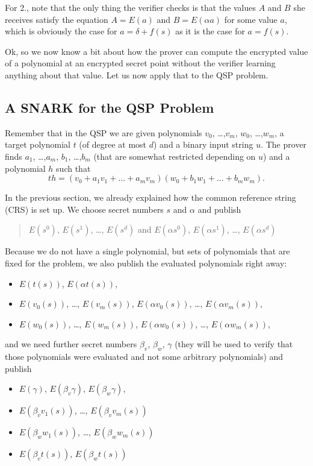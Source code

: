 \documentclass[11pt,letterpaper]{article}
\begin{document}
For 2., note that the only thing the verifier checks is that the values $A$ and $B$ she receives satisfy the equation $A = E(a)$ and $B = E(\alpha  a)$ for some value $a$, which is obviously the case for $a = \delta  + f(s)$ as it is the case for $a = f(s)$.


Ok, so we now know a bit about how the prover can compute the encrypted value of a polynomial at an encrypted secret point without the verifier learning anything about that value. Let us now apply that to the QSP problem.

\subsection{A SNARK for the QSP Problem}


Remember that in the QSP we are given polynomials $v_{0}$, \dots,$v_{m}$, $w_{0}$, \dots,$w_{m}$, a target polynomial $t$ (of degree at most $d$) and a binary input string $u$. The prover finds $a_{1}$, \dots,$a_{m}$, $b_{1}$, \dots,$b_{m}$ (that are somewhat restricted depending on $u$) and a polynomial $h$ such that
\[
t h = (v_{0} + a_{1}v_{1} +  \dots  + a_{m}v_{m}) (w_{0} + b_{1}w_{1} +  \dots  + b_{m}w_{m}).
\]


In the previous section, we already explained how the common reference string (CRS) is set up. We choose secret numbers $s$ and $\alpha$  and publish
\begin{quote}
$E(s^{0})$, $E(s^{1})$,  \dots, $E(s^{d})$ \quad and \quad $E(\alpha s^{0})$, $E(\alpha s^{1})$,  \dots, $E(\alpha s^{d})$
\end{quote}

Because we do not have a single polynomial, but sets of polynomials that are fixed for the problem, we also publish the evaluated polynomials right away:
\begin{itemize}
\item $E(t(s))$, $E(\alpha  t(s))$,
\item $E(v_{0}(s))$,  \dots, $E(v_{m}(s))$, $E(\alpha  v_{0}(s))$,  \dots, $E(\alpha  v_{m}(s))$,
\item $E(w_{0}(s))$,  \dots, $E(w_{m}(s))$, $E(\alpha  w_{0}(s))$,  \dots, $E(\alpha  w_{m}(s))$,
\end{itemize}


and we need further secret numbers $\beta _{v}$, $\beta _{w}$, $\gamma$  (they will be used to verify that those polynomials were evaluated and not some arbitrary polynomials) and publish
\begin{itemize}
\item $E(\gamma )$, $E(\beta _{v} \gamma )$, $E(\beta _{w} \gamma )$,
\item $E(\beta _{v} v_{1}(s))$,  \dots, $E(\beta _{v} v_{m}(s))$
\item $E(\beta _{w} w_{1}(s))$,  \dots, $E(\beta _{w} w_{m}(s))$
\item $E(\beta _{v} t(s))$, $E(\beta _{w} t(s))$
\end{itemize}
\end{document}
